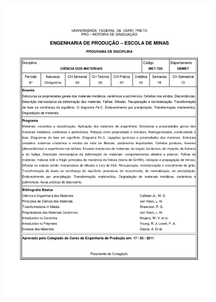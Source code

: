 \begin{figure}[p]
	\centering 
	\includegraphics[scale=0.7]{capitulos/anexo1-programas-disciplina/eg315.pdf}
\end{figure}

